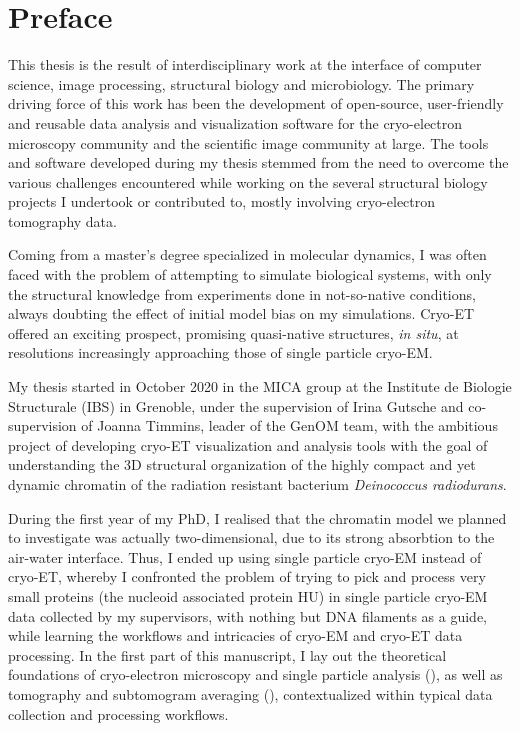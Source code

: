 \chapter{Preface}

This thesis is the result of interdisciplinary work at the interface of computer science, image processing, structural biology and microbiology.
The primary driving force of this work has been the development of open-source, user-friendly and reusable data analysis and visualization software for the cryo-electron microscopy community and the scientific image community at large.
The tools and software developed during my thesis stemmed from the need to overcome the various challenges encountered while working on the several structural biology projects I undertook or contributed to, mostly involving cryo-electron tomography data.

Coming from a master's degree specialized in molecular dynamics, I was often faced with the problem of attempting to simulate biological systems, with only the structural knowledge from experiments done in not-so-native conditions, always doubting the effect of initial model bias on my simulations.
Cryo-ET offered an exciting prospect, promising quasi-native structures, \textit{in situ}, at resolutions increasingly approaching those of single particle cryo-EM.

My thesis started in October 2020 in the MICA group at the Institute de Biologie Structurale (IBS) in Grenoble, under the supervision of Irina Gutsche and co-supervision of Joanna Timmins, leader of the GenOM team, with the ambitious project of developing cryo-ET visualization and analysis tools with the goal of understanding the 3D structural organization of the highly compact and yet dynamic chromatin of the radiation resistant bacterium \textit{Deinococcus radiodurans}.

During the first year of my PhD, I realised that the chromatin model we planned to investigate was actually two-dimensional, due to its strong absorbtion to the air-water interface.
Thus, I ended up using single particle cryo-EM instead of cryo-ET, whereby I confronted the problem of trying to pick and process very small proteins (the nucleoid associated protein HU) in single particle cryo-EM data collected by my supervisors, with nothing but DNA filaments as a guide, while learning the workflows and intricacies of cryo-EM and cryo-ET data processing.
In the first part of this manuscript, I lay out the theoretical foundations of cryo-electron microscopy and single particle analysis (), as well as tomography and subtomogram averaging (), contextualized within typical data collection and processing workflows.

